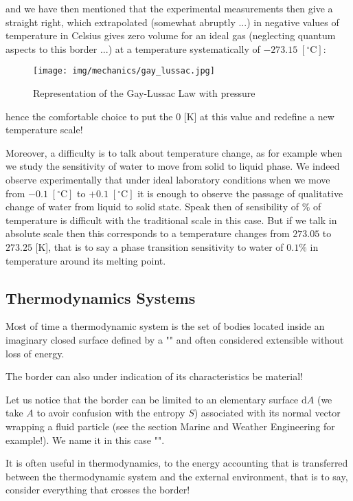 	and we have then mentioned that the experimental measurements then give a straight right, which extrapolated (somewhat abruptly ...) in negative values of temperature in Celsius gives zero volume for an ideal gas (neglecting quantum aspects to this border ...) at a temperature systematically of $-273.15\; [^\circ \text{C}]$:
	\begin{figure}[H]
		\centering
		\texttt{[image: img/mechanics/gay\_lussac.jpg]}
		\caption{Representation of the Gay-Lussac Law with pressure}
	\end{figure}
	hence the comfortable choice to put the $0$ [K] at this value and redefine a new temperature scale!
	
	Moreover, a difficulty is to talk about temperature change, as for example when we study the sensitivity of water to move from solid to liquid phase. We indeed observe experimentally that under ideal laboratory conditions when we move from $-0.1\; [^\circ \text{C}]$ to $+0.1\; [^\circ \text{C}]$ it is enough to observe the passage of qualitative change of water from liquid to solid state. Speak then of  sensibility of $\%$ of temperature is difficult with the traditional scale in this case. But if we talk in absolute scale then this corresponds to a temperature changes from $273.05$ to $273.25$ [K], that is to say a phase transition sensitivity to water of $0.1\%$ in temperature around its melting point.
	
	\subsection{Thermodynamics Systems}
	Most of time a thermodynamic system is the set of bodies located inside an imaginary closed surface defined by a "" and often considered extensible without loss of energy. 

	The border can also under indication of its characteristics be material!

	Let us notice that the border can be limited to an elementary surface $\mathrm{d}A$ (we take $A$ to avoir confusion with the entropy $S$) associated with its normal vector wrapping a fluid particle (see the section Marine and Weather Engineering for example!). We name it in this case "".

	It is often useful in thermodynamics, to the energy accounting that is transferred between the thermodynamic system and the external environment, that is to say, consider everything that crosses the border!

